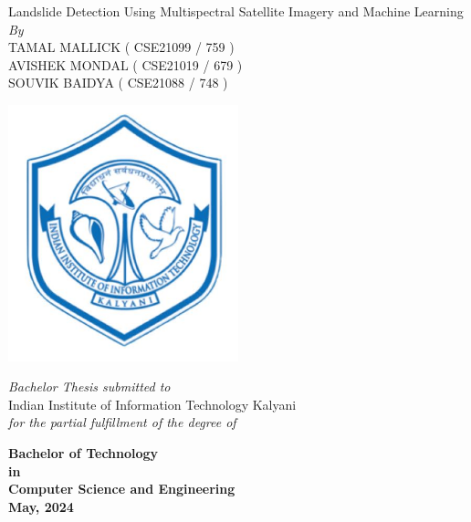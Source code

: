\documentclass[12pt,a4paper]{report}
\newcommand{\mytitle}{Landslide Detection Using Multispectral Satellite Imagery and Machine Learning}
\newcommand{\mySpace}{0.6cm}
\newcommand{\mySpaceHalf}{0.5cm}
\begin{document}
\clearpage
	\begin{titlepage}

    \centering
    {\Huge \mytitle \fontsize{24}{28.8}\selectfont {}\selectfont}\\
\vspace{\mySpace}
    \large \textit{By}\\
\vspace{\mySpace}
    {\Large TAMAL MALLICK ( CSE21099 / 759 ) \\
    \vspace{0.1cm}
    AVISHEK MONDAL ( CSE21019 / 679 ) \\
    \vspace{0.1cm}
    SOUVIK BAIDYA ( CSE21088  / 748 ) \\
    \fontsize{18}{22}\selectfont {}\selectfont
\vspace{\mySpace}}
    \begin{center}
        \includegraphics[width=0.5\textwidth]{iiitk_logo} %
    \end{center}
    {\Large \textit{Bachelor Thesis submitted to}\\
    \vspace{\mySpaceHalf}
    Indian Institute of Information Technology Kalyani \\ \vspace{\mySpaceHalf}
	 \textit{for the partial fulfillment of the degree of}\\ \vspace{\mySpaceHalf}

{\bfseries %
	 Bachelor of Technology \\ 
	 in \\
	 Computer Science and Engineering\\ \vspace{\mySpaceHalf}
	  May, 2024 \fontsize{18}{22}}\selectfont {}\selectfont}
    \vspace*{\fill}
\end{titlepage}
\restoregeometry
\end{document}
